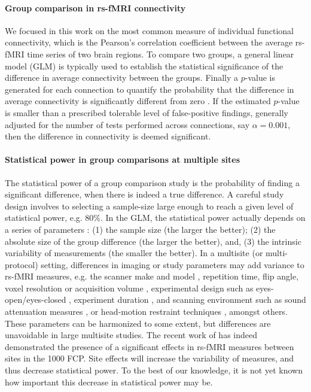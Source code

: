 \documentclass[authoryear]{elsarticle}
\begin{document}
\paragraph{Group comparison in rs-fMRI connectivity}
We focused in this work on the most common measure of individual functional connectivity, which is the Pearson's correlation coefficient between the average rs-fMRI time series of two brain regions. To compare two groups, a general linear model (GLM) is typically used to establish the statistical significance of the difference in average connectivity between the groups. Finally a $p$-value is generated for each connection to quantify the probability that the difference in average connectivity is significantly different from zero \citep{Worsley1995}. If the estimated $p$-value is smaller than a prescribed tolerable level of false-positive findings, generally adjusted for the number of tests performed across connections, say $\alpha=0.001$, then the difference in connectivity is deemed significant. 

\paragraph{Statistical power in group comparisons at multiple sites}
The statistical power of a group comparison study is the probability of finding
a significant difference, when there is indeed a true difference. A careful study design involves to selecting a sample-size large enough to reach a given
 level of statistical power, e.g. $80\%$. In the GLM, the statistical power
actually depends on a series of parameters \citep{Desmond2002}: (1) the sample
size (the larger the better); (2) the absolute size of the group difference (the
larger the better), and, (3) the intrinsic variability of measurements (the
smaller the better).
In a multisite (or multi-protocol) setting, differences in imaging or study parameters may add variance to rs-fMRI measures, e.g. the scanner make and model \citep{Friedman2006,Friedman2008}, repetition time, flip angle, voxel resolution or acquisition volume \citep{Friedman2006a}, experimental design such as eyes-open/eyes-closed \citep{Yan2009}, experiment duration \citep{VanDijk2010}, and scanning environment such as sound attenuation measures \citep{Elliott1999}, or head-motion restraint techniques \citep{Edward2000,VanDijk2012}, amongst others. These parameters can be harmonized to some extent, but differences are unavoidable in large multisite studies. The recent work of \cite{Yan2013h} has indeed demonstrated the presence of a significant effects in rs-fMRI measures between sites in the 1000 FCP. Site effects will increase the variability of measures, and thus decrease statistical power. To the best of our knowledge, it is not yet known how important this decrease in statistical power may be. 
\end{document}

